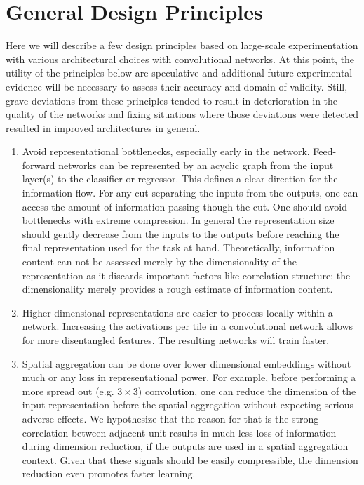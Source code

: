 \section{General Design Principles}
\label{principles}
Here we will describe a few design principles based on large-scale experimentation with various architectural choices with convolutional networks. At this point, the utility of the principles below are speculative and additional future experimental evidence will be necessary to assess their accuracy and domain of validity. Still, grave deviations from these principles tended to result in deterioration in the quality of the networks and fixing situations where those deviations were detected resulted in improved architectures in general.

\begin{enumerate}
  \item Avoid representational bottlenecks, especially early in the network. Feed-forward networks can be represented by an acyclic graph from the input layer(s) to the classifier or regressor. This defines a clear direction for the information flow. For any cut separating the inputs from the outputs, one can access the amount of information passing though the cut. One should avoid bottlenecks with extreme compression. In general the representation size should gently decrease from the inputs to the outputs before reaching the final representation used for the task at hand. Theoretically, information content can not be assessed merely by the dimensionality of the representation as it discards important factors like correlation structure; the dimensionality merely provides a rough estimate of information content. \label{nobottlenecks}
  \item Higher dimensional representations are easier to process locally within a network. Increasing the activations per tile in a convolutional network allows for more disentangled features. The resulting networks will train faster. \label{highdim}
  \item Spatial aggregation can be done over lower dimensional embeddings without much or any loss in representational power. For example, before performing a more spread out (e.g. $3\times 3$) convolution, one can reduce the dimension of the input representation before the spatial aggregation without expecting serious adverse effects. We hypothesize that the reason for that is the strong correlation between adjacent unit results in much less loss of information during dimension reduction, if the outputs are used in a spatial aggregation context. Given that these signals should be easily compressible, the dimension reduction even promotes faster learning. \label{lowdim}

\end{enumerate}
